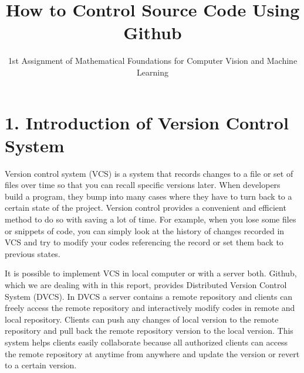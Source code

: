 \documentclass[fleqn,10pt]{wlscirep}
\title{How to Control Source Code Using Github}
\author{\normalsize 1st Assignment of Mathematical Foundations for Computer Vision and Machine Learning}
\affil{{Dahye Kim 20153712}\\{Chung-Ang University}\\{$20^{th}$ of September of 2018}}
\begin{document}
\flushbottom
\maketitle
%
%
\thispagestyle{empty}
\section*{1. Introduction of Version Control System}

Version control system (VCS) is a system that records changes to a file or set of files over time so that you can recall specific versions later.\cite{GitIntro} When developers build a program, they bump into many cases where they have to turn back to a certain state of the project. Version control provides a convenient and efficient method to do so with saving a lot of time. For example, when you lose some files or snippets of code, you can simply look at the history of changes recorded in VCS and try to modify your codes referencing the record or set them back to previous states.

It is possible to implement VCS in local computer or with a server both. Github, which we are dealing with in this report, provides Distributed Version Control System (DVCS). In DVCS a server contains a remote repository and clients can freely access the remote repository and interactively modify codes in remote and local repository. Clients can push any changes of local version to the remote repository and pull back the remote repository version to the local version. This system helps clients easily collaborate because all authorized clients can access the remote repository at anytime from anywhere and update the version or revert to a certain version.
\end{document}
